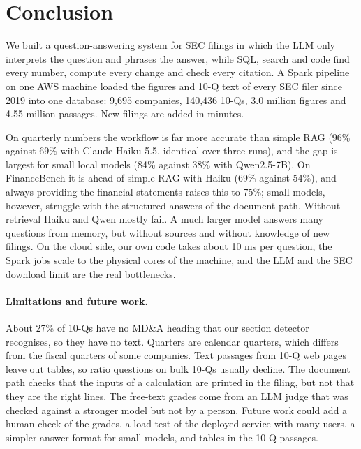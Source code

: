 \section{Conclusion}

We built a question-answering system for SEC filings in which the LLM only interprets the question
and phrases the answer, while SQL, search and code find every number, compute every change and check
every citation. A Spark pipeline on one AWS machine loaded the figures and 10-Q text of every SEC filer
since 2019 into one database: 9,695 companies, 140,436 10-Qs, 3.0 million figures and 4.55 million
passages. New filings are added in minutes.

On quarterly numbers the workflow is far more accurate than simple RAG (96\% against 69\% with Claude
Haiku 5.5, identical over three runs), and the gap is largest for small local models (84\% against
38\% with Qwen2.5-7B). On FinanceBench it is ahead of simple RAG with Haiku (69\% against 54\%), and
always providing the financial statements raises this to 75\%; small models, however, struggle with
the structured answers of the document path. Without retrieval Haiku and Qwen mostly fail. A much
larger model answers many questions from memory, but without sources and without knowledge of new
filings. On the cloud side, our own code takes about 10 ms per question, the Spark jobs scale to the
physical cores of the machine, and the LLM and the SEC download limit are the real bottlenecks.

\paragraph{Limitations and future work.} About 27\% of 10-Qs have no MD\&A heading that our section
detector recognises, so they have no text. Quarters are calendar quarters, which differs from the
fiscal quarters of some companies. Text passages from 10-Q web pages leave out tables, so ratio
questions on bulk 10-Qs usually decline. The document path checks that the inputs of a calculation are
printed in the filing, but not that they are the right lines. The free-text grades come from an LLM
judge that was checked against a stronger model but not by a person. Future work could add a human
check of the grades, a load test of the deployed service with many users, a simpler answer format for
small models, and tables in the 10-Q passages.
